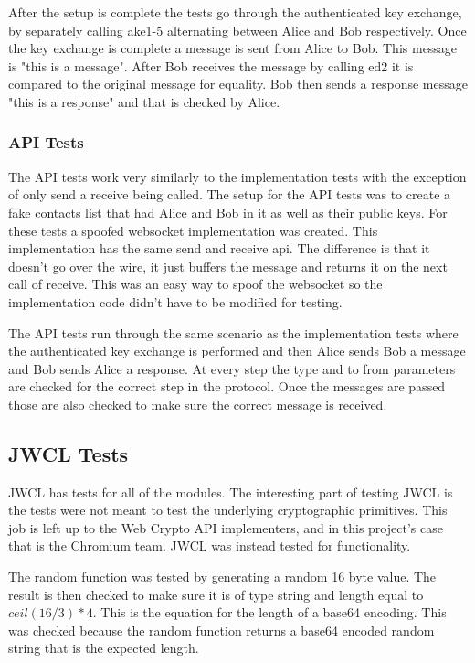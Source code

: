 After the setup is complete the tests go through the authenticated key exchange, by separately calling ake1-5 alternating between Alice and Bob respectively. Once the key exchange is complete a message is sent from Alice to Bob. This message is "this is a message". After Bob receives the message by calling ed2 it is compared to the original message for equality. Bob then sends a response message "this is a response" and that is checked by Alice.


\subsubsection{API Tests} 


The API tests work very similarly to the implementation tests with the exception of only send a receive being called. The setup for the API tests was to create a fake contacts list that had Alice and Bob in it as well as their public keys. For these tests a spoofed websocket implementation was created. This implementation has the same send and receive api. The difference is that it doesn't go over the wire, it just buffers the message and returns it on the next call of receive. This was an easy way to spoof the websocket so the implementation code didn't have to be modified for testing.


The API tests run through the same scenario as the implementation tests where the authenticated key exchange is performed and then Alice sends Bob a message and Bob sends Alice a response. At every step the type and to from parameters are checked for the correct step in the protocol. Once the messages are passed those are also checked to make sure the correct message is received.


\subsection{JWCL Tests}


JWCL has tests for all of the modules. The interesting part of testing JWCL is the tests were not meant to test the underlying cryptographic primitives. This job is left up to the Web Crypto API implementers, and in this project's case that is the Chromium team. JWCL was instead tested for functionality.


The random function was tested by generating a random 16 byte value. The result is then checked to make sure it is of type string and length equal to $ceil(16/3)*4$. This is the equation for the length of a base64 encoding. This was checked because the random function returns a base64 encoded random string that is the expected length.


